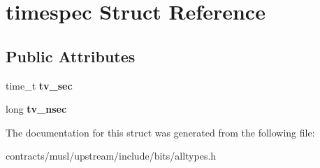 \hypertarget{structtimespec}{}\section{timespec Struct Reference}
\label{structtimespec}
\subsection*{Public Attributes}
\begin{DoxyCompactItemize}
\item 
\mbox{\label{structtimespec_afc3302668d7cb5952f590da69fdd4955}} 
time\+\_\+t {\bfseries tv\+\_\+sec}
\item 
\mbox{\label{structtimespec_ae3c7510dafa8cbcaede866ed13c99683}} 
long {\bfseries tv\+\_\+nsec}
\end{DoxyCompactItemize}


The documentation for this struct was generated from the following file\+:\begin{DoxyCompactItemize}
\item 
contracts/musl/upstream/include/bits/alltypes.\+h\end{DoxyCompactItemize}
